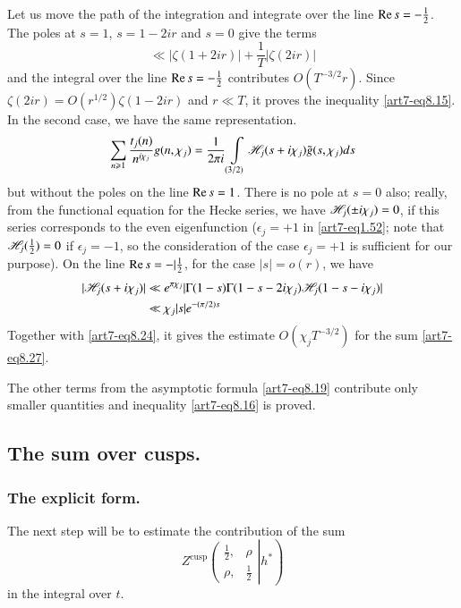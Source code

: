 Let us move the path of the integration and integrate over the line $\operatorname{Re} s = -\frac{1}{2}$. The poles at $s =1$, $s =1 -2ir$ and $s =0$ give the terms 
\begin{equation}
\ll |\zeta (1+ 2 ir )| + \frac{1}{T} |\zeta(2 ir)| \label{art7-eq8.26}
\end{equation}
and the integral over the line $\operatorname{Re} s = - \frac{1}{2}$ contributes $O(T^{-3/2} r)$. Since $\zeta(2 ir) = O(r^{1/2}) \zeta (1-2 ir)$ and $r \ll T$, it proves the inequality \eqref{art7-eq8.15}. In the second case, we have the same representation.
\begin{equation}
\sum\limits_{n \geqslant 1}  \frac{t_j(n)}{n^{i \chi_j}} g(n, \chi_j) =\frac{1}{2 \pi i} \int\limits_{(3/2)} \mathscr{H}_j (s+ i \chi_j) \tilde{g} (s,\chi_j) ds\label{art7-eq8.27}
\end{equation}
but without the poles on the line $\operatorname{Re} s =1$. There is no pole at $s =0$ also; really, from the functional equation for the Hecke series, we have $\mathscr{H}_j (\pm i \chi_j) =0$, if this series corresponds to the even eigenfunction  ($\epsilon_j =  +1$ in \eqref{art7-eq1.52}; note that $\mathscr{H}_j(\frac{1}{2}) =0$ if $\epsilon_j =-1$, so the consideration of the case $\epsilon_j = + 1$ is sufficient for our purpose). On the line $\operatorname{Re} s = - |\frac{1}{2}$, for the case $|s| = o (r)$, we have 
\begin{align}
|\mathscr{H}_j(s+ i\chi_j)| & \ll e^{\pi \chi_j} | \Gamma (1-s) \Gamma (1-s-2 i \chi_j) \mathscr{H}_j (1-s-i\chi_j) |\label{art7-eq8.28}\\
& \ll \chi_j |s| e^{-(\pi/2)s} \notag
\end{align}
Together with \eqref{art7-eq8.24}, it gives the estimate $O(\chi_j T^{-3/2})$ for the sum \eqref{art7-eq8.27}.

The other terms from the asymptotic formula \eqref{art7-eq8.19} contribute only smaller quantities and inequality \eqref{art7-eq8.16} is proved.

\setcounter{section}{2}
\subsection{The sum over cusps.}\label{art7-subsec2.8}

\subsubsection{The explicit form.}\label{art7-subsubsec2.8.1}

The next step will be to estimate the contribution of the sum 
$$
Z^{\text{cusp}} \left. \left(\begin{matrix}
\frac{1}{2}, & \rho\\
\rho, & \frac{1}{2}
\end{matrix}\right| h^\ast \right)
$$
in the integral over $t$.


